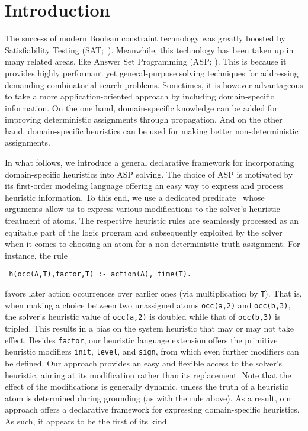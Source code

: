 
\section{Introduction}\label{sec:introduction}

The success of modern Boolean constraint technology was greatly boosted by Satisfiability Testing
(SAT;~\cite{SATHandbook}).
Meanwhile, this technology has been taken up in many related areas, 
like
Answer Set Programming (ASP; \cite{baral02a}).
This is because it provides highly performant yet general-purpose solving techniques for addressing demanding combinatorial search problems.
%
Sometimes, it is however advantageous to take a more application-oriented approach
by including domain-specific information.
On the one hand, domain-specific knowledge can be added for improving deterministic assignments
through propagation.
And on the other hand, domain-specific heuristics can be used for making better non-deterministic assignments.

In what follows,
we introduce a general declarative framework for incorporating domain-specific heuristics into ASP solving.
The choice of ASP is motivated by its first-order modeling language offering an easy way to express and process
heuristic information.
To this end,
we use a dedicated predicate \hpredicate\
whose arguments allow us to express various modifications to the solver's heuristic treatment of atoms.
The respective heuristic rules are seamlessly processed as an equitable part of the logic program
and subsequently exploited by the solver when it comes to choosing an atom for a non-deterministic 
truth assignment.
%
For instance, the rule
\begin{lstlisting}
_h(occ(A,T),factor,T) :- action(A), time(T).
\end{lstlisting}
favors later action occurrences over earlier ones (via multiplication by \texttt{T}).
That is, when making a choice between two unassigned atoms \texttt{occ(a,2)} and \texttt{occ(b,3)},
the solver's heuristic value of \texttt{occ(a,2)} is doubled while that of \texttt{occ(b,3)} is tripled.
This results in a bias on the system heuristic that may or may not take effect.
%
Besides \texttt{factor}, our heuristic language extension offers the primitive heuristic modifiers
\texttt{init}, \texttt{level}, and \texttt{sign}, from which even further modifiers can be defined.
Our approach provides an easy and flexible access to the solver's heuristic,
aiming at its modification rather than its replacement.
Note that the effect of the modifications is generally dynamic,
unless the truth of a heuristic atom is determined during grounding (as with the rule above).
As a result, our approach offers a declarative framework for expressing domain-specific heuristics.
As such, it appears to be the first of its kind.

